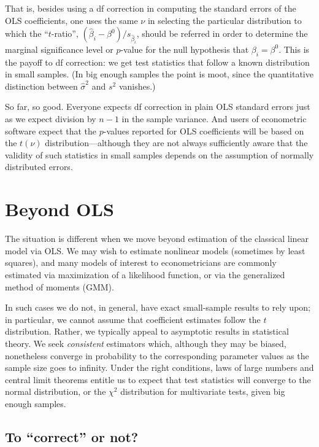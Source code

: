 That is, besides using a df correction in computing the standard
errors of the OLS coefficients, one uses the same $\nu$ in selecting
the particular distribution to which the ``$t$-ratio'',
$(\hat{\beta}_i-\beta^0)/s_{\hat{\beta}_i}$, should be referred in
order to determine the marginal significance level or $p$-value for
the null hypothesis that $\beta_i = \beta^0$.  This is the payoff to
df correction: we get test statistics that follow a known distribution
in small samples.  (In big enough samples the point is moot, since the
quantitative distinction between $\hat\sigma^2$ and $s^2$ vanishes.)

So far, so good.  Everyone expects df correction in plain OLS standard
errors just as we expect division by $n-1$ in the sample variance.
And users of econometric software expect that the $p$-values reported
for OLS coefficients will be based on the $t(\nu)$
distribution---although they are not always sufficiently aware that
the validity of such statistics in small samples depends on the
assumption of normally distributed errors.

\section{Beyond OLS}
\label{sec:df-beyond}

The situation is different when we move beyond estimation of the
classical linear model via OLS.  We may wish to estimate nonlinear
models (sometimes by least squares), and many models of interest to
econometricians are commonly estimated via maximization of a
likelihood function, or via the generalized method of moments (GMM).

In such cases we do not, in general, have exact small-sample results
to rely upon; in particular, we cannot assume that coefficient
estimates follow the $t$ distribution.  Rather, we typically appeal to
asymptotic results in statistical theory.  We seek \textit{consistent}
estimators which, although they may be biased, nonetheless converge in
probability to the corresponding parameter values as the sample size
goes to infinity.  Under the right conditions, laws of large numbers
and central limit theorems entitle us to expect that test statistics
will converge to the normal distribution, or the $\chi^2$ distribution
for multivariate tests, given big enough samples.

\subsection{To ``correct'' or not?}

